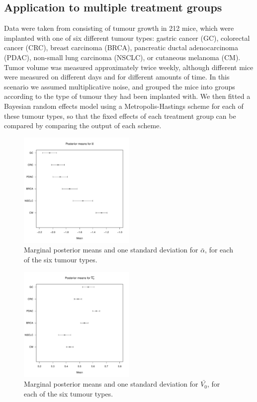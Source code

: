 \documentclass[11pt,a4paper]{article}
\begin{document}

\subsection{Application to multiple treatment groups}
\label{subsec:app2}

Data were taken from \cite{Gao15} consisting of tumour growth in 212 mice, which were implanted with one of six different tumour types: gastric cancer (GC), colorectal cancer (CRC), breast carcinoma (BRCA), pancreatic ductal adenocarcinoma (PDAC), non-small lung carcinoma (NSCLC), or cutaneous melanoma (CM). Tumor volume was measured approximately twice weekly, although different mice were measured on different days and for different amounts of time. In this scenario we assumed multiplicative noise, and grouped the mice into groups according to the type of tumour they had been implanted with. We then fitted a Bayesian random effects model using a Metropolis-Hastings scheme for each of these tumour types, so that the fixed effects of each treatment group can be compared by comparing the output of each scheme.
\begin{figure}
\centering
\includegraphics[width=0.5\textwidth]{alphaBarMeans.pdf}
\caption{Marginal posterior means and one standard deviation for $\bar{\alpha}$, for each of the six tumour types.}
\label{fig:alphaBarMeans}
\end{figure}
\begin{figure}
\centering
\includegraphics[width=0.5\textwidth]{V0BarMeans.pdf}
\caption{Marginal posterior means and one standard deviation for $\bar{V_0}$, for each of the six tumour types.}
\label{fig:V0BarMeans}
\end{figure}
\end{document}
